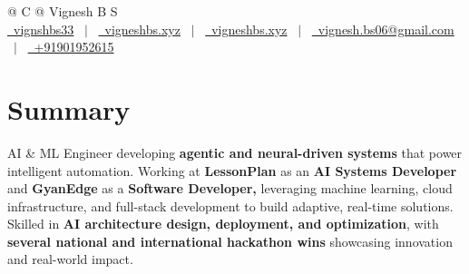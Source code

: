 \documentclass[a4paper,12pt]{article}
\begin{document}
\pagestyle{empty} 



\begin{tabularx}{\linewidth}{@{} C @{}}
\Huge{Vignesh B S}\\[7.5pt]
\href{https://github.com/vigneshbs33}{\raisebox{-0.05\height}\faGithub\ vignshbs33} \ $|$ \ 
\href{https://linkedin.com/in/vigneshbs-dev}{\raisebox{-0.05\height}\faLinkedin\ vigneshbs.xyz} \ $|$ \ 
\href{https://vigneshbs.xyz}{\raisebox{-0.05\height}\faGlobe \ vigneshbs.xyz} \ $|$ \ 
\href{mailto:vignesh.bs06@gmail.com}{\raisebox{-0.05\height}\faEnvelope \ vignesh.bs06@gmail.com} \ $|$ \ 
\href{tel:+919019526145}{\raisebox{-0.05\height}\faMobile \ +91901952615}\\
\end{tabularx}


\section{Summary}
AI \& ML Engineer developing \textbf{agentic and neural-driven systems} that power intelligent automation. Working at \textbf{LessonPlan} as an \textbf{AI Systems Developer} and \textbf{GyanEdge} as a \textbf{Software Developer,} leveraging machine learning, cloud infrastructure, and full-stack development to build adaptive, real-time solutions. Skilled in \textbf{AI architecture design, deployment, and optimization}, with \textbf{several national and international hackathon wins} showcasing innovation and real-world impact.
\end{document}
